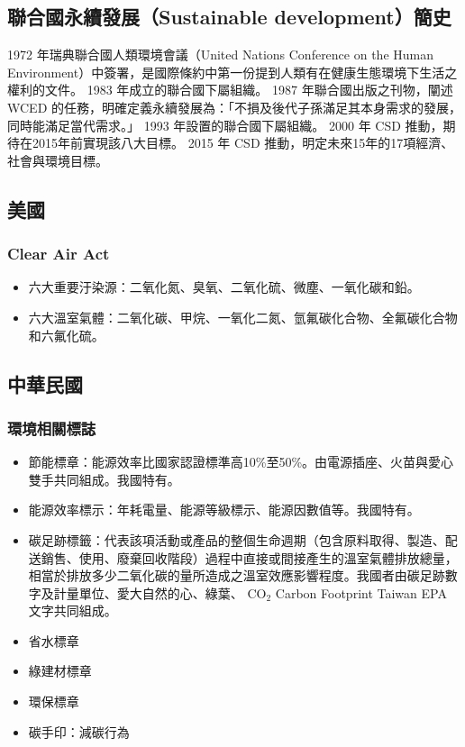 \documentclass[a4paper,12pt]{report}
\begin{document}
\begin{itemize}
\subsection{聯合國永續發展（Sustainable development）簡史}
1972 年瑞典聯合國人類環境會議（United Nations Conference on the Human Environment）中簽署，是國際條約中第一份提到人類有在健康生態環境下生活之權利的文件。
1983 年成立的聯合國下屬組織。
1987 年聯合國出版之刊物，闡述 WCED 的任務，明確定義永續發展為：「不損及後代子孫滿足其本身需求的發展，同時能滿足當代需求。」
1993 年設置的聯合國下屬組織。
2000 年 CSD 推動，期待在2015年前實現該八大目標。
2015 年 CSD 推動，明定未來15年的17項經濟、社會與環境目標。
\subsection{美國}
\subsubsection{Clear Air Act}
\begin{itemize}
\item 六大重要汙染源：二氧化氮、臭氧、二氧化硫、微塵、一氧化碳和鉛。
\item 六大溫室氣體：二氧化碳、甲烷、一氧化二氮、氫氟碳化合物、全氟碳化合物和六氟化硫。
\end{itemize}
\subsection{中華民國}
\subsubsection{環境相關標誌}
\bct\bfH\ctr{}\ef\FB\ect\bct\bfH\ctr{}\ef\FB\ect
\begin{itemize}
\item 節能標章：能源效率比國家認證標準高10\%至50\%。由電源插座、火苗與愛心雙手共同組成。我國特有。
\item 能源效率標示：年耗電量、能源等級標示、能源因數值等。我國特有。
\item 碳足跡標籤：代表該項活動或產品的整個生命週期（包含原料取得、製造、配送銷售、使用、廢棄回收階段）過程中直接或間接產生的溫室氣體排放總量，相當於排放多少二氧化碳的量所造成之溫室效應影響程度。我國者由碳足跡數字及計量單位、愛大自然的心、綠葉、 CO$_2$ Carbon Footprint Taiwan EPA 文字共同組成。
\item 省水標章
\item 綠建材標章
\item 環保標章
\item 碳手印：減碳行為
\end{itemize}

\end{itemize}
\end{document}
